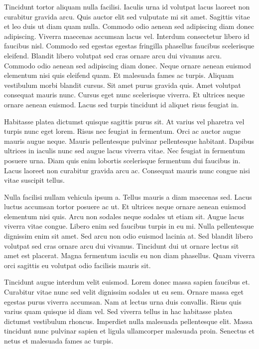 \documentclass[11pt,a4paper]{article}
\begin{document}
Tincidunt tortor aliquam nulla facilisi. Iaculis urna id volutpat lacus laoreet non curabitur gravida arcu. Quis auctor elit sed vulputate mi sit amet. Sagittis vitae et leo duis ut diam quam nulla. Commodo odio aenean sed adipiscing diam donec adipiscing. Viverra maecenas accumsan lacus vel. Interdum consectetur libero id faucibus nisl. Commodo sed egestas egestas fringilla phasellus faucibus scelerisque eleifend. Blandit libero volutpat sed cras ornare arcu dui vivamus arcu. Commodo odio aenean sed adipiscing diam donec. Neque ornare aenean euismod elementum nisi quis eleifend quam. Et malesuada fames ac turpis. Aliquam vestibulum morbi blandit cursus. Sit amet purus gravida quis. Amet volutpat consequat mauris nunc. Cursus eget nunc scelerisque viverra. Et ultrices neque ornare aenean euismod. Lacus sed turpis tincidunt id aliquet risus feugiat in.

Habitasse platea dictumst quisque sagittis purus sit. At varius vel pharetra vel turpis nunc eget lorem. Risus nec feugiat in fermentum. Orci ac auctor augue mauris augue neque. Mauris pellentesque pulvinar pellentesque habitant. Dapibus ultrices in iaculis nunc sed augue lacus viverra vitae. Nec feugiat in fermentum posuere urna. Diam quis enim lobortis scelerisque fermentum dui faucibus in. Lacus laoreet non curabitur gravida arcu ac. Consequat mauris nunc congue nisi vitae suscipit tellus.

Nulla facilisi nullam vehicula ipsum a. Tellus mauris a diam maecenas sed. Lacus luctus accumsan tortor posuere ac ut. Et ultrices neque ornare aenean euismod elementum nisi quis. Arcu non sodales neque sodales ut etiam sit. Augue lacus viverra vitae congue. Libero enim sed faucibus turpis in eu mi. Nulla pellentesque dignissim enim sit amet. Sed arcu non odio euismod lacinia at. Sed blandit libero volutpat sed cras ornare arcu dui vivamus. Tincidunt dui ut ornare lectus sit amet est placerat. Magna fermentum iaculis eu non diam phasellus. Quam viverra orci sagittis eu volutpat odio facilisis mauris sit.

Tincidunt augue interdum velit euismod. Lorem donec massa sapien faucibus et. Curabitur vitae nunc sed velit dignissim sodales ut eu sem. Ornare massa eget egestas purus viverra accumsan. Nam at lectus urna duis convallis. Risus quis varius quam quisque id diam vel. Sed viverra tellus in hac habitasse platea dictumst vestibulum rhoncus. Imperdiet nulla malesuada pellentesque elit. Massa tincidunt nunc pulvinar sapien et ligula ullamcorper malesuada proin. Senectus et netus et malesuada fames ac turpis.
\end{document}
